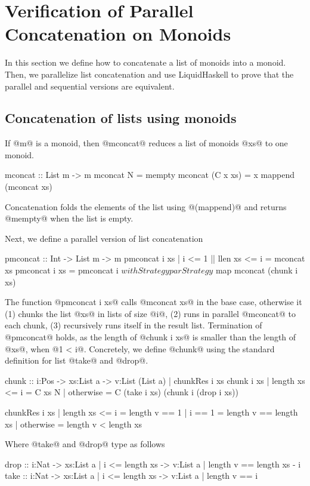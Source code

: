\section{Verification of Parallel Concatenation on Monoids}\label{sec:parallelization}
In this section we define how to concatenate a list of monoids
into a monoid. 
%
Then, we parallelize list concatenation 
and use LiquidHaskell to prove that the 
parallel and sequential versions are equivalent. 

\subsection{Concatenation of lists using monoids}
If @m@ is a monoid, then @mconcat@ reduces a list of monoids @xs@
to one monoid. 
\begin{code}
mconcat :: List m -> m 
mconcat N        = mempty
mconcat (C x xs) = x mappend (mconcat xs)
\end{code}
%
Concatenation folds the elements of the list using @(mappend)@ 
and returns @mempty@ when the list is empty. 

Next, we define a parallel version of list concatenation 
%
\begin{code}
pmconcat :: Int -> List m -> m
pmconcat i xs  | i <= 1 || llen xs <= i
  = mconcat xs 
pmconcat i xs 
  = pmconcat i $ withStrategy parStrategy $  
                 map mconcat (chunk i xs)
\end{code}%
The function @pmconcat i xs@ calls @mconcat xs@ in the base case, 
otherwise it
(1) chunks the list @xs@ in lists of size @i@, 
(2) runs in parallel @mconcat@ to each chunk, 
(3) recursively runs itself in the result list.
%
Termination of @pmconcat@ holds, as the length of @chunk i xs@
is smaller than the length of @xs@, when @1 < i@. 
%
Concretely, we define @chunk@ using the standard definition for 
list @take@ and @drop@.
\begin{code}
chunk :: i:Pos -> xs:List a 
  -> {v:List (List a) | chunkRes i xs } 
chunk i xs 
  | length xs <= i 
  = C xs N 
  | otherwise
  = C (take i xs) (chunk i (drop i xs))

chunkRes i xs
  | length xs <= i = length v == 1 
  | i == 1         = length v == length xs
  | otherwise     = length v < length xs
\end{code}

Where @take@ and @drop@ type as follows
\begin{code}
drop :: i:Nat -> xs:{List a | i <= length xs } 
  -> {v:List a | length v == length xs - i }
take :: i:Nat -> xs:{List a | i <= length xs } 
  -> {v:List a | length v == i }
\end{code}


